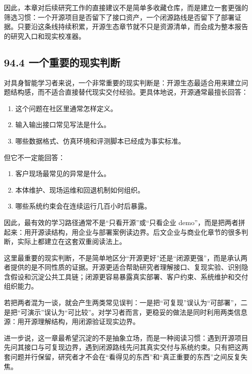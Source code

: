 因此，本章对后续研究工作的直接建议不是简单多收藏仓库，而是建立一套更强的筛选习惯：一个开源项目是否留下了接口资产，一个闭源路线是否留下了部署证据。只要沿这条线持续积累，开源生态章节就不只是资源清单，而会成为整本报告的研究入口和现实校准器。

\subsection*{94.4 一个重要的现实判断}


对具身智能学习者来说，一个非常重要的现实判断是：开源生态最适合用来建立问题结构感，而不适合直接替代现实交付经验。更具体地说，开源通常最擅长回答：

\begin{enumerate}
\item 这个问题在社区里通常怎样定义。
\item 输入输出接口常见写法是什么。
\item 哪些数据格式、仿真环境和评测脚本已经成为事实标准。
\end{enumerate}

但它不一定能回答：

\begin{enumerate}
\item 客户现场最常见的异常是什么。
\item 本体维护、现场运维和回退机制如何组织。
\item 哪些系统约束会在连续运行几百小时后暴露。
\end{enumerate}

因此，最有效的学习路径通常不是“只看开源”或“只看企业 demo”，而是把两者拼起来：用开源读结构，用企业与部署案例读边界。后文企业与商业化章节的很多判断，实际上都建立在这套双重阅读法上。

这里最重要的现实判断，不是简单地区分“开源更好”还是“闭源更强”，而是承认两者提供的是不同性质的证据。开源更适合帮助研究者理解接口、复现实验、识别隐含假设和沉淀公共工具链；闭源更容易暴露真实部署、客户约束、系统维护和交付组织能力。

若把两者混为一谈，就会产生两类常见误判：一是把“可复现”误认为“可部署”，二是把“可演示”误认为“可比较”。对学习者而言，更稳妥的做法是同时利用两类信息源：用开源理解结构，用闭源验证现实边界。

进一步说，这一章最希望沉淀的不是抽象立场，而是一种阅读习惯：遇到开源项目先问其接口与可复现边界，遇到闭源路线先问其真实交付与系统约束。只有把这两套问题并行保留，研究者才不会在“看得见的东西”和“真正重要的东西”之间反复失焦。

